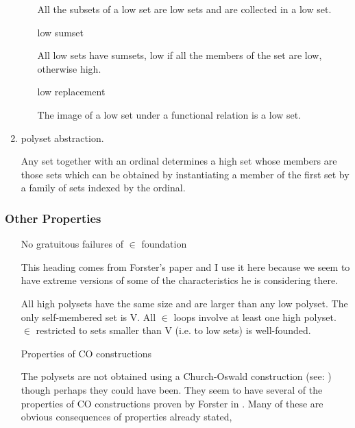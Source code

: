 \documentclass[numreferences]{rbjk}
\begin{document}
\begin{article}
\begin{enumerate}
\begin{itemize}
All the subsets of a low set are low sets and are collected in a low set.

\item [low sumset]\ 

All low sets have sumsets, low if all the members of the set are low, otherwise high.

\item [low replacement]\ 

The image of a low set under a functional relation is a low set.

\end{itemize}

\item polyset abstraction.

Any set together with an ordinal determines a high set whose members are those sets which can be obtained by instantiating a member of the first set by a family of sets indexed by the ordinal.

\end{enumerate}

\subsubsection{Other Properties}

\begin{itemize}

\item[No gratuitous failures of $\in$ foundation]\ 

This heading comes from Forster's paper \cite{forster2006} and I use it here because we seem to have extreme versions of some of the characteristics he is considering there.

All high polysets have the same size and are larger than any low polyset.
The only self-membered set is V.
All $\in$ loops involve at least one high polyset.
$\in$ restricted to sets smaller than V (i.e. to low sets) is well-founded.

\item[Properties of CO constructions]\ 

The polysets are not obtained using a Church-Oswald construction (see: \cite{forster2005}) though perhaps they could have been.
They seem to have several of the properties of CO constructions proven by Forster in \cite{forster2005}.
Many of these are obvious consequences of properties already stated,

\begin{itemize}


\end{itemize}
\end{itemize}
\end{article}
\end{document}
